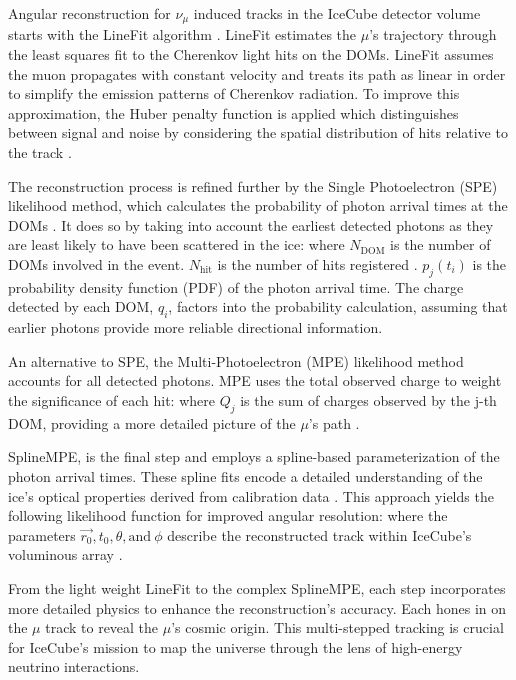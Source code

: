 Angular reconstruction for $\nu_\mu$ induced tracks in the IceCube detector volume starts with the LineFit algorithm \cite{AMANDA_trackreco}.
LineFit estimates the $\mu$'s trajectory through the least squares fit to the Cherenkov light hits on the DOMs.
LineFit assumes the muon propagates with constant velocity and treats its path as linear in order to simplify the emission patterns of Cherenkov radiation.
To improve this approximation, the Huber penalty function \cite{Huber:1964} is applied which distinguishes between signal and noise by considering the spatial distribution of hits relative to the track \cite{IC3_Calibration}.

The reconstruction process is refined further by the Single Photoelectron (SPE) likelihood method, which calculates the probability of photon arrival times at the DOMs \cite{Huber:1964}.
It does so by taking into account the earliest detected photons as they are least likely to have been scattered in the ice:
\spe
where $N_{\mathrm{DOM}}$ is the number of DOMs involved in the event.
$N_{\mathrm{hit}}$ is the number of hits registered \cite{AMANDA_trackreco}.
$p_j(t_i)$ is the probability density function (PDF) of the photon arrival time.
The charge detected by each DOM, $q_i$, factors into the probability calculation, assuming that earlier photons provide more reliable directional information.

An alternative to SPE, the Multi-Photoelectron (MPE) likelihood method accounts for all detected photons.
MPE uses the total observed charge to weight the significance of each hit:
\mpe
where $Q_j$ is the sum of charges observed by the j-th DOM, providing a more detailed picture of the $\mu$'s path \cite{AMANDA_trackreco}.

SplineMPE, is the final step and employs a spline-based parameterization of the photon arrival times.
These spline fits encode a detailed understanding of the ice's optical properties derived from calibration data \cite{AMANDA_trackreco}.
This approach yields the following likelihood function for improved angular resolution:
\splineMPE
where the parameters $\vec{r_0}, t_0, \theta, \mathrm{ and}~\phi$ describe the reconstructed track within IceCube's voluminous array \cite{AMANDA_trackreco}.

From the light weight LineFit to the complex SplineMPE, each step incorporates more detailed physics to enhance the reconstruction's accuracy.
Each hones in on the $\mu$ track to reveal the $\mu$'s cosmic origin.
This multi-stepped tracking is crucial for IceCube's mission to map the universe through the lens of high-energy neutrino interactions.

